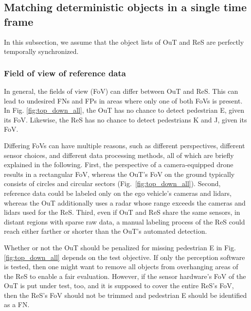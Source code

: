 \documentclass[conference]{IEEEtran}
\begin{document}


\subsection{Matching deterministic objects in a single time frame}
\label{sec:oracle_simple}

In this subsection, we assume that the object lists of OuT and ReS are perfectly temporally synchronized. 

\subsubsection{Field of view of reference data}
\label{sec:fov_ref}
In general, the fields of view (FoV) can differ between OuT and ReS. This can lead to undesired FNs and FPs in areas where only one of both FoVs is present. 
In Fig. \ref{fig:top_down_all}, the OuT has no chance to detect pedestrian E, given its FoV. 
Likewise, the ReS has no chance to detect pedestrians K and J, given its FoV. 

Differing FoVs can have multiple reasons, such as different perspectives, different sensor choices, and different data processing methods, all of which are briefly explained in the following.
First, the perspective of a camera-equipped drone results in a rectangular FoV, whereas the OuT's FoV on the ground typically consists of circles and circular sectors (Fig.~\ref{fig:top_down_all}).
Second, reference data could be labeled only on the ego vehicle's cameras and lidars, whereas the OuT additionally uses a radar whose range exceeds the cameras and lidars used for the ReS. 
Third, even if OuT and ReS share the same sensors, in distant regions with sparse raw data, a manual labeling process of the ReS could reach either farther or shorter than the OuT's automated detection.

Whether or not the OuT should be penalized for missing pedestrian E in Fig. \ref{fig:top_down_all} depends on the test objective. 
If only the perception software is tested, then one might want to remove all objects from overhanging areas of the ReS to enable a fair evaluation.
However, if the sensor hardware's FoV of the OuT is put under test, too, and it is supposed to cover the entire ReS's FoV, then the ReS's FoV should not be trimmed and pedestrian E should be identified as a FN. 
\end{document}
